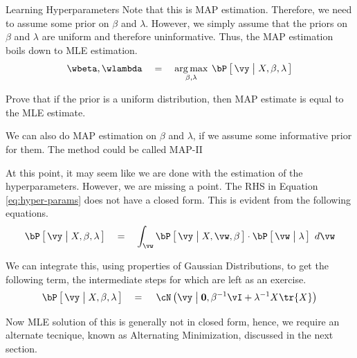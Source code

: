 \documentclass{article}
\begin{document}
\begin{ssection}[2]{Learning Hyperparameters}
	Note that this is MAP estimation. Therefore, we need to assume some prior on $\beta$ and $\lambda$. However, we simply assume that the priors on $\beta$ and $\lambda$ are uniform and therefore uninformative. Thus, the MAP estimation boils down to MLE estimation.
	\begin{equation}
		\wbeta, \wlambda	\eq	\argmax{\beta, \lambda} \prob{\vy \pipe X, \beta, \lambda}
		\label{eq:hyper-params}
	\end{equation}

	\begin{exercise}
		Prove that if the prior is a uniform distribution, then MAP estimate is equal to the MLE estimate.
	\end{exercise}

	\begin{remark}
		We can also do MAP estimation on $\beta$ and $\lambda$, if we assume some informative prior for them. The method could be called MAP-II
	\end{remark}

	At this point, it may seem like we are done with the estimation of the hyperparameters. However, we are missing a point. The RHS in Equation \ref{eq:hyper-params} does not have a closed form. This is evident from the following equations.
	\begin{align*}
		\prob{\vy \pipe X, \beta, \lambda}	\eq	\int_{\vw} \prob{\vy \pipe X, \vw, \beta} \cdot \prob{\vw \pipe \lambda}\ d\vw 
	\end{align*}

	We can integrate this, using properties of Gaussian Distributions, to get the following term, the intermediate steps for which are left as an exercise.
	\begin{equation}
		\prob{\vy \pipe X, \beta, \lambda}	\eq \ND{\vy \pipe \vzero, \beta^{-1} \vI + \lambda^{-1} X \tr{X}}
		\label{eq:hyper-mle}
	\end{equation}

	Now MLE solution of this is generally not in closed form, hence, we require an alternate tecnique, known as Alternating Minimization, discussed in the next section.

\end{ssection}
\end{document}
